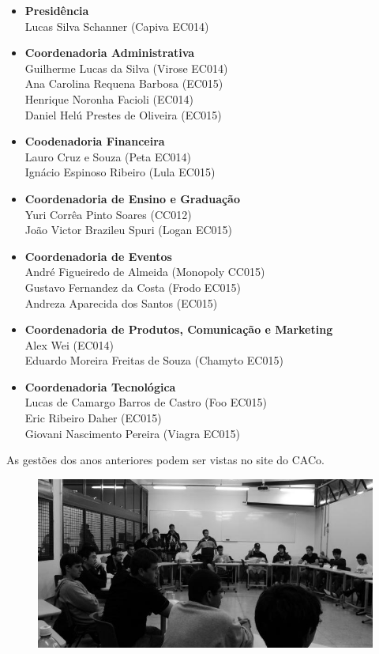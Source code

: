 \begin{itemize}
    \item   \textbf{Presidência}
        \\Lucas Silva Schanner (Capiva EC014)

    \item   \textbf{Coordenadoria Administrativa}
        \\Guilherme Lucas da Silva (Virose EC014)
        \\Ana Carolina Requena Barbosa (EC015)
        \\Henrique Noronha Facioli (EC014)
        \\Daniel Helú Prestes de Oliveira (EC015)

    \item   \textbf{Coodenadoria Financeira}
        \\Lauro Cruz e Souza (Peta EC014)
        \\Ignácio Espinoso Ribeiro (Lula EC015)

    \item   \textbf{Coordenadoria de Ensino e Graduação}
        \\Yuri Corrêa Pinto Soares (CC012)
        \\João Victor Brazileu Spuri (Logan EC015)
        
    \item   \textbf{Coordenadoria de Eventos}
        \\André Figueiredo de Almeida (Monopoly CC015)
        \\Gustavo Fernandez da Costa (Frodo EC015)
        \\Andreza Aparecida dos Santos (EC015)

    \item   \textbf{Coordenadoria de Produtos, Comunicação e Marketing}
        \\Alex Wei (EC014)
        \\Eduardo Moreira Freitas de Souza (Chamyto EC015)

    \item    \textbf{Coordenadoria Tecnológica}
        \\Lucas de Camargo Barros de Castro (Foo EC015)
        \\Eric Ribeiro Daher (EC015)
        \\Giovani Nascimento Pereira (Viagra EC015)
\end{itemize}

As gestões dos anos anteriores podem ser vistas no site do CACo.

\begin{figure}[H]
    \centering
    \includegraphics[width=.45\textwidth]{img/alem_da_graduacao/caco_pipocaco.jpg}
\end{figure}
